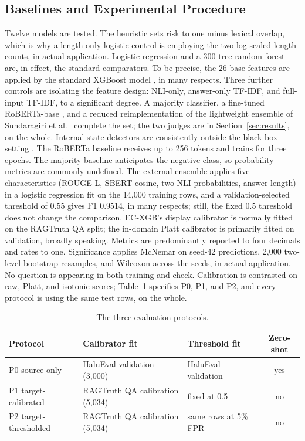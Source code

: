 \documentclass[a4paper,fleqn]{cas-sc}
\begin{document}
\subsection{Baselines and Experimental Procedure}

Twelve models are tested. The heuristic sets risk to one minus lexical overlap, which is why a length-only logistic control is employing the two log-scaled length counts, in actual application. Logistic regression and a 300-tree random forest are, in effect, the standard comparators. To be precise, the 26 base features are applied by the standard XGBoost model \cite{xgboost}, in many respects. Three further controls are isolating the feature design: NLI-only, answer-only TF-IDF, and full-input TF-IDF, to a significant degree. A majority classifier, a fine-tuned RoBERTa-base \cite{liu2019roberta}, and a reduced reimplementation of the lightweight ensemble of Sundaragiri et al.\ \cite{ijert} complete the set; the two judges are in Section~\ref{sec:results}, on the whole. Internal-state detectors are consistently outside the black-box setting \cite{inside2024}. The RoBERTa baseline receives up to 256 tokens and trains for three epochs. The majority baseline anticipates the negative class, so probability metrics are commonly undefined. The external ensemble applies five characteristics (ROUGE-L, SBERT cosine, two NLI probabilities, answer length) in a logistic regression fit on the 14{,}000 training rows, and a validation-selected threshold of 0.55 gives F1 0.9514, in many respects; still, the fixed 0.5 threshold does not change the comparison. EC-XGB's display calibrator is normally fitted on the RAGTruth QA split; the in-domain Platt calibrator is primarily fitted on validation, broadly speaking. Metrics are predominantly reported to four decimals and rates to one. Significance applies McNemar on seed-42 predictions, 2,000 two-level bootstrap resamples, and Wilcoxon across the seeds, in actual application. No question is appearing in both training and check. Calibration is contrasted on raw, Platt, and isotonic scores; Table~\ref{tab:protocols} specifies P0, P1, and P2, and every protocol is using the same test rows, on the whole.

\begin{table}[pos=htbp]
  \centering
  \caption{The three evaluation protocols.}
  \label{tab:protocols}
  \begin{tabular}{lllc}
    \toprule
    \textbf{Protocol}     & \textbf{Calibrator fit}           & \textbf{Threshold fit} & \textbf{Zero-shot} \\
    \midrule
    P0 source-only        & HaluEval validation (3{,}000)     & HaluEval validation    & yes                \\
    P1 target-calibrated  & RAGTruth QA calibration (5{,}034) & fixed at 0.5           & no                 \\
    P2 target-thresholded & RAGTruth QA calibration (5{,}034) & same rows at 5\% FPR   & no                 \\
    \bottomrule
  \end{tabular}
\end{table}
\end{document}

